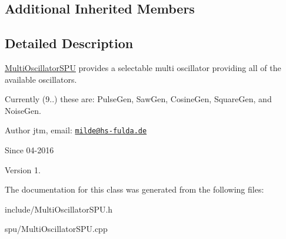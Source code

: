 \subsection*{Additional Inherited Members}


\subsection{Detailed Description}
\hyperlink{classMultiOscillatorSPU}{Multi\+Oscillator\+S\+PU} provides a selectable multi oscillator providing all of the available oscillators.

Currently (9..) these are\+: Pulse\+Gen, Saw\+Gen, Cosine\+Gen, Square\+Gen, and Noise\+Gen.

\begin{DoxyAuthor}{Author}
jtm, email\+:  \href{mailto:milde@hs-fulda.de}{\tt milde@hs-\/fulda.\+de} 
\end{DoxyAuthor}
\begin{DoxySince}{Since}
04-\/2016 
\end{DoxySince}
\begin{DoxyVersion}{Version}
1. 
\end{DoxyVersion}


The documentation for this class was generated from the following files\+:\begin{DoxyCompactItemize}
\item 
include/Multi\+Oscillator\+S\+P\+U.\+h\item 
spu/Multi\+Oscillator\+S\+P\+U.\+cpp\end{DoxyCompactItemize}
